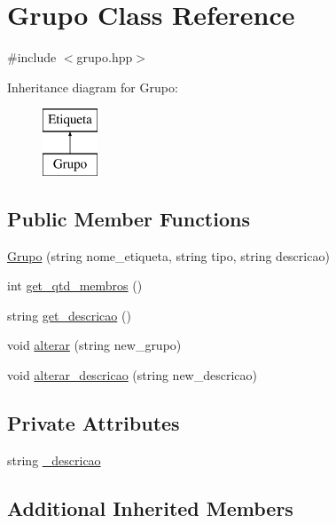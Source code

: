 \hypertarget{classGrupo}{}\section{Grupo Class Reference}
\label{classGrupo}


{\ttfamily \#include $<$grupo.\+hpp$>$}

Inheritance diagram for Grupo\+:\begin{figure}[H]
\begin{center}
\leavevmode
\includegraphics[height=2.000000cm]{classGrupo}
\end{center}
\end{figure}
\subsection*{Public Member Functions}
\begin{DoxyCompactItemize}
\item 
\hyperlink{classGrupo_a14745ea67ff25543b2cf949f765a726b}{Grupo} (string nome\+\_\+etiqueta, string tipo, string descricao)
\item 
int \hyperlink{classGrupo_a9d93d76de63fb7b7faca9e7c1d1c607a}{get\+\_\+qtd\+\_\+membros} ()
\item 
string \hyperlink{classGrupo_a750990ef2e00c1c56558aeacab25d5a9}{get\+\_\+descricao} ()
\item 
void \hyperlink{classGrupo_ad89de5bdcf8aa7913bb9d3cabe16aba1}{alterar} (string new\+\_\+grupo)
\item 
void \hyperlink{classGrupo_a307ca8081150b1c9784d22ff1d3d72d2}{alterar\+\_\+descricao} (string new\+\_\+descricao)
\end{DoxyCompactItemize}
\subsection*{Private Attributes}
\begin{DoxyCompactItemize}
\item 
string \hyperlink{classGrupo_a8f3c802c33537298ddbbc8b11bcea2f3}{\+\_\+descricao}
\end{DoxyCompactItemize}
\subsection*{Additional Inherited Members}



